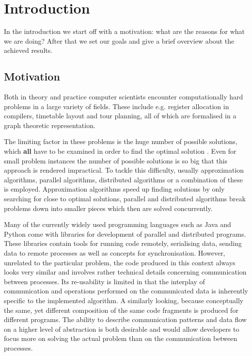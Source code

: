 \chapter{Introduction}
In the introduction we start off with a motivation: what are the reasons for what we are doing? After that we set our goals and give a brief overview about the achieved results.

\section{Motivation}
Both in theory and practice computer scientists encounter computationally hard problems in a large variety of fields. These include e.g. register allocation in compilers, timetable layout and tour planning, all of which are formalised in a graph theoretic \cite{Garey:1979:CIG:578533} representation.

The limiting factor in these problems is the huge number of possible solutions, which \textbf{all} have to be examined in order to find the optimal solution \cite{Garey:1979:CIG:578533}. Even for small problem instances the number of possible solutions is so big that this approach is rendered impractical. To tackle this difficulty, usually approximation algorithms, parallel algorithms, distributed algorithms or a combination of these is employed. Approximation algorithms speed up finding solutions by only searching for close to optimal solutions, parallel and distributed algorithms break problems down into smaller pieces which then are solved concurrently.

Many of the currently widely used programming languages such as Java and Python come with libraries for development of parallel and distributed programs. These libraries contain tools for running code remotely, serialising data, sending data to remote processes as well as concepts for synchronisation. However, unrelated to the particular problem, the code produced in this context always looks very similar and involves rather technical details concerning communication between processes. Its re-usability is limited in that the interplay of communication and operations performed on the communicated data is inherently specific to the implemented algorithm. A similarly looking, because conceptually the same, yet different composition of the same code fragments is produced for different programs. The ability to describe communication patterns and data flow on a higher level of abstraction is both desirable and would allow developers to focus more on solving the actual problem than on the communication between processes.

